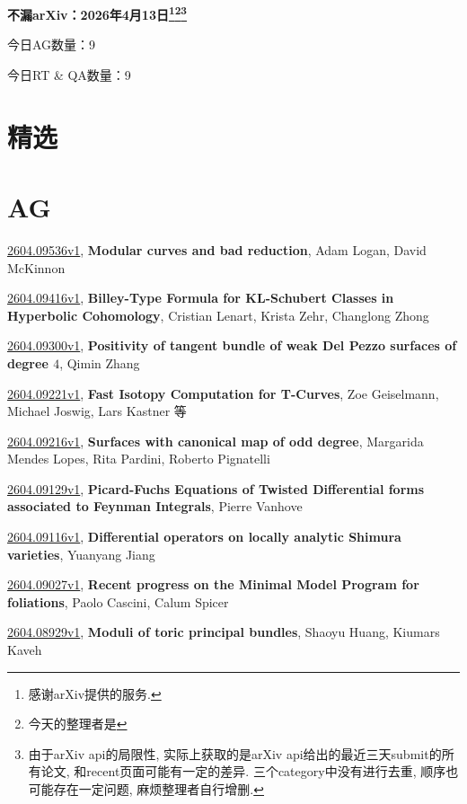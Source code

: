 \documentclass[9pt, a4paper]{article}
\theoremstyle{plain}
\theoremstyle{definition}
\theoremstyle{remark}
\newcommand{\arxiv}[3]{\href{https://arxiv.org/abs/#1}{#1}, \textbf{\textcolor{arxivblue}{#2}}, #3}
\newcommand{\AGnumber}{9}
\newcommand{\RTQAnumber}{9}
\newcommand{\NewestDate}{2026年4月13日}
\newcommand{\todayarXiver}{} %
\begin{document}
\begin{center}
    \Huge\textbf{不漏arXiv：\NewestDate\footnote{感谢arXiv提供的服务.}\footnote{今天的整理者是\todayarXiver}\footnote{由于arXiv api的局限性, 实际上获取的是arXiv api给出的最近三天submit的所有论文, 和recent页面可能有一定的差异. 三个category中没有进行去重, 顺序也可能存在一定问题, 麻烦整理者自行增删.}} \\
\end{center}

\setcounter{section}{-1}

\begin{center}
    今日AG数量：\AGnumber
    
    今日RT \& QA数量：\RTQAnumber
    
\end{center}


\section{精选}


\section{AG}
\arxiv{2604.09536v1}{Modular curves and bad reduction}{Adam Logan, David McKinnon}

\arxiv{2604.09416v1}{Billey-Type Formula for KL-Schubert Classes in Hyperbolic Cohomology}{Cristian Lenart, Krista Zehr, Changlong Zhong}

\arxiv{2604.09300v1}{Positivity of tangent bundle of weak Del Pezzo surfaces of degree $4$}{Qimin Zhang}

\arxiv{2604.09221v1}{Fast Isotopy Computation for T-Curves}{Zoe Geiselmann, Michael Joswig, Lars Kastner 等}

\arxiv{2604.09216v1}{Surfaces with canonical map of odd degree}{Margarida Mendes Lopes, Rita Pardini, Roberto Pignatelli}

\arxiv{2604.09129v1}{Picard-Fuchs Equations of Twisted Differential forms associated to Feynman Integrals}{Pierre Vanhove}

\arxiv{2604.09116v1}{Differential operators on locally analytic Shimura varieties}{Yuanyang Jiang}

\arxiv{2604.09027v1}{Recent progress on the Minimal Model Program for foliations}{Paolo Cascini, Calum Spicer}

\arxiv{2604.08929v1}{Moduli of toric principal bundles}{Shaoyu Huang, Kiumars Kaveh}
\end{document}
